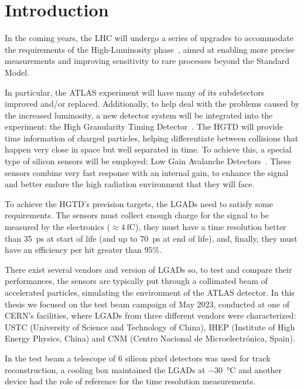 
\chapter*{Introduction}\label{chap:intro}

In the coming years, the LHC will undergo a series of upgrades to accommodate the requirements of the High-Luminosity phase~\cite{cernHLLHCProject}, aimed at enabling more precise measurements and improving sensitivity to rare processes beyond the Standard Model.

In particular, the ATLAS experiment will have many of its subdetectors improved and/or replaced. Additionally, to help deal with the problems caused by the increased luminosity, a new detector system will be integrated into the experiment: the High Granularity Timing Detector~\cite{cernTechnicalDesign}. The HGTD will provide time information of charged particles, helping differentiate between collisions that happen very close in space but well separated in time. To achieve this, a special type of silicon sensors will be employed: Low Gain Avalanche Detectors~\cite{Pellegrini:2014lki}. These sensors combine very fast response with an internal gain, to enhance the signal and better endure the high radiation environment that they will face.

To achieve the HGTD's precision targets, the LGADs need to satisfy some requirements. The sensors must collect enough charge for the signal to be measured by the electronics (\(\approx \qty{4}{\femto\coulomb} \)), they must have a time resolution better than \qty{35}{\pico\second} at start of life (and up to \qty{70}{\pico\second} at end of life), and, finally, they must have an efficiency per hit greater than \(95\%\).

There exist several vendors and version of LGADs so, to test and compare their performances, the sensors are typically put through a collimated beam of accelerated particles, simulating the environment of the ATLAS detector. In this thesis we focused on the test beam campaign of May 2023, conducted at one of CERN's facilities, where LGADs from three different vendors were characterized: USTC (University of Science and Technology of China), IHEP (Institute of High Energy Physics, China) and CNM (Centro Nacional de Microelectr\'onica, Spain).

In the test beam a telescope of 6 silicon pixel detectors was used for track reconstruction, a cooling box maintained the LGADs at \qty{-30}{\degreeCelsius} and another device had the role of reference for the time resolution measurements. 


